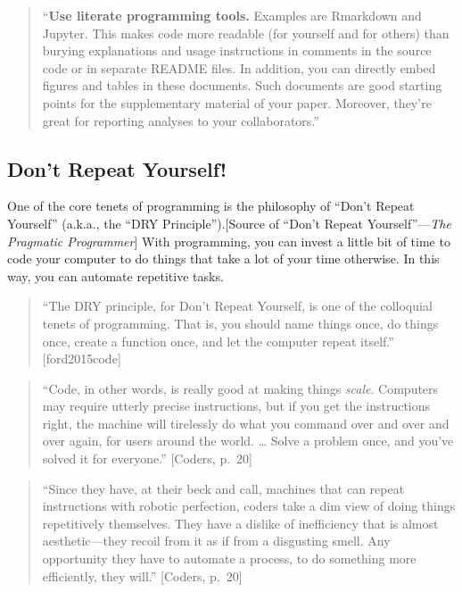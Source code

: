 \documentclass[]{tufte-book}
\begin{document}
\begin{quote}
``\textbf{Use literate programming tools.} Examples are Rmarkdown and Jupyter. This
makes code more readable (for yourself and for others) than burying
explanations and usage instructions in comments in the source code or in
separate README files. In addition, you can directly embed figures and tables
in these documents. Such documents are good starting points for the supplementary
material of your paper. Moreover, they're great for reporting analyses to your
collaborators.'' \citep{holmes2018modern}
\end{quote}

\hypertarget{dont-repeat-yourself}{%
\subsection{Don't Repeat Yourself!}\label{dont-repeat-yourself}}

One of the core tenets of programming is the philosophy of ``Don't Repeat
Yourself'' (a.k.a., the ``DRY Principle'').{[}Source of ``Don't Repeat
Yourself''---\emph{The Pragmatic Programmer}{]} With programming, you can invest a
little bit of time to code your computer to do things that take a lot of your
time otherwise. In this way, you can automate repetitive tasks.

\begin{quote}
``The DRY principle, for Don't Repeat Yourself, is one of the colloquial tenets
of programming. That is, you should name things once, do things once, create a
function once, and let the computer repeat itself.'' {[}ford2015code{]}
\end{quote}

\begin{quote}
``Code, in other words, is really good at making things \emph{scale}. Computers
may require utterly precise instructions, but if you get the instructions
right, the machine will tirelessly do what you command over and over and
over again, for users around the world. \ldots{} Solve a problem once, and you've
solved it for everyone.'' {[}Coders, p.~20{]}
\end{quote}

\begin{quote}
``Since they have, at their beck and call, machines that can repeat
instructions with robotic perfection, coders take a dim view of doing
things repetitively themselves. They have a dislike of inefficiency
that is almost aesthetic---they recoil from it as if from a disgusting
smell. Any opportunity they have to automate a process, to do something
more efficiently, they will.'' {[}Coders, p.~20{]}
\end{quote}
\end{document}
